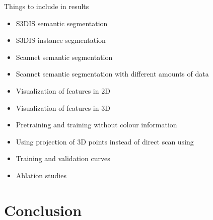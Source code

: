 \documentclass[10pt,twocolumn,letterpaper]{article}
\begin{document}
Things to include in results
\begin{itemize}
    \item S3DIS semantic segmentation
    \item S3DIS instance segmentation
    \item Scannet semantic segmentation
    \item Scannet semantic segmentation with different amounts of data
    \item Visualization of features in 2D
    \item Visualization of features in 3D
    \item Pretraining and training without colour information
    \item Using projection of 3D points instead of direct scan using \cite{katz2007Direct}
    \item Training and validation curves
    \item Ablation studies
\end{itemize}

\section{Conclusion}
\label{sec:conclusion}



\newpage
{\small
    
    
}
\end{document}
